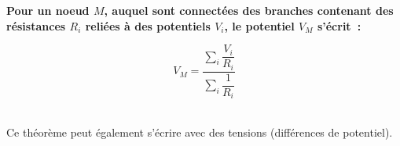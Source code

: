 \vspace{0.5cm}
\begin{minipage}{5cm}
\begin{center}

\end{center}
\end{minipage}
\hspace{1cm}
\begin{minipage}{10cm}

	\textbf{Pour un noeud $M$, auquel sont connectées des branches contenant des résistances $R_i$ reliées à des potentiels $V_i$, le potentiel $V_M$ s'écrit~:}

\begin{equation}
	V_M = \dfrac{\displaystyle\sum_{i}\dfrac{V_i}{R_i}}{\displaystyle\sum_{i} \dfrac{1}{R_i} }
\end{equation}

\end{minipage}\\

\smallskip
Ce théorème peut également s'écrire avec des tensions (différences de potentiel).

